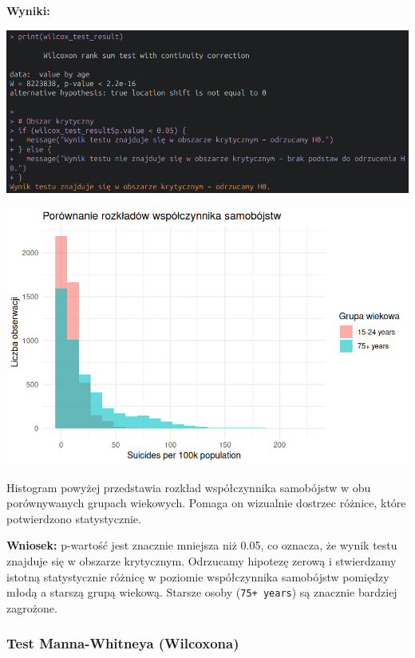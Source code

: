 \documentclass[polish]{article}
\begin{document}
    \textbf{Wyniki:}

    \begin{center}
        \includegraphics[scale=0.52]{img/hipoteza2.png}
    \end{center}

    \begin{center}
        \includegraphics[scale=0.75]{img/histogram_hipoteza2.png}
    \end{center}

    Histogram powyżej przedstawia rozkład współczynnika samobójstw w obu porównywanych grupach wiekowych. Pomaga on wizualnie dostrzec różnice, które potwierdzono statystycznie.

    \textbf{Wniosek:} p-wartość jest znacznie mniejsza niż 0.05, co oznacza, że wynik testu znajduje się w obszarze krytycznym. Odrzucamy hipotezę zerową i stwierdzamy istotną statystycznie różnicę w poziomie współczynnika samobójstw pomiędzy młodą a starszą grupą wiekową. Starsze osoby (\texttt{75+ years}) są znacznie bardziej zagrożone.

    \subsubsection*{Test Manna-Whitneya (Wilcoxona)}
\end{document}
